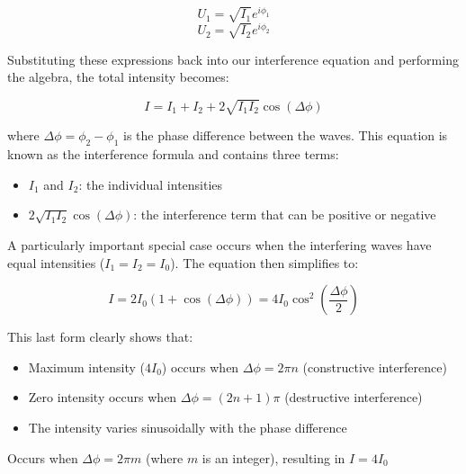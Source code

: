 \documentclass[
  a4paper,
]{book}
\providecommand{\tightlist}{%
  \setlength{\itemsep}{0pt}\setlength{\parskip}{0pt}}
\begin{document}
\[
U_1=\sqrt{I_1}e^{i\phi_1}
\] \[
U_2=\sqrt{I_2}e^{i\phi_2}
\]

Substituting these expressions back into our interference equation and
performing the algebra, the total intensity becomes:

\[
I=I_1+I_2+2\sqrt{I_1 I_2}\cos(\Delta \phi)
\]

where \(\Delta \phi=\phi_2-\phi_1\) is the phase difference between the
waves. This equation is known as the interference formula and contains
three terms:

\begin{itemize}
\tightlist
\item
  \(I_1\) and \(I_2\): the individual intensities
\item
  \(2\sqrt{I_1 I_2}\cos(\Delta \phi)\): the interference term that can
  be positive or negative
\end{itemize}

A particularly important special case occurs when the interfering waves
have equal intensities (\(I_1=I_2=I_0\)). The equation then simplifies
to:

\[
I=2I_0(1+\cos(\Delta \phi))=4I_0\cos^2\left(\frac{\Delta \phi}{2}\right)
\]

This last form clearly shows that:

\begin{itemize}
\tightlist
\item
  Maximum intensity (\(4I_0\)) occurs when \(\Delta \phi = 2\pi n\)
  (constructive interference)
\item
  Zero intensity occurs when \(\Delta \phi = (2n+1)\pi\) (destructive
  interference)
\item
  The intensity varies sinusoidally with the phase difference
\end{itemize}

\begin{tcolorbox}[enhanced jigsaw, breakable, toptitle=1mm, bottomrule=.15mm, colbacktitle=quarto-callout-note-color!10!white, title=\textcolor{quarto-callout-note-color}{\faInfo}\hspace{0.5em}{Constructive Interference}, arc=.35mm, rightrule=.15mm, bottomtitle=1mm, opacityback=0, toprule=.15mm, coltitle=black, leftrule=.75mm, opacitybacktitle=0.6, colback=white, left=2mm, titlerule=0mm, colframe=quarto-callout-note-color-frame]

Occurs when \(\Delta \phi=2\pi m\) (where \(m\) is an integer),
resulting in \(I=4I_0\)

\end{tcolorbox}
\end{document}
